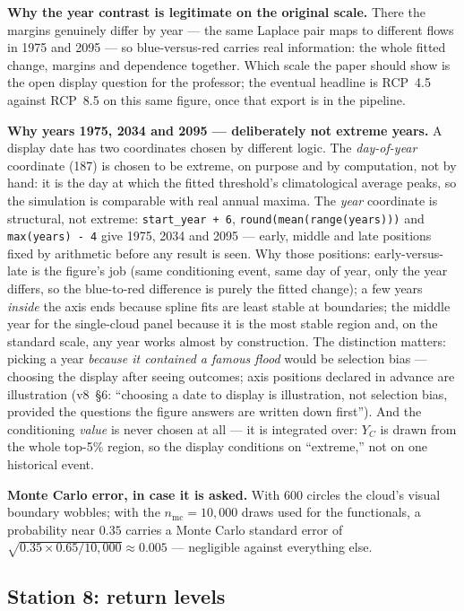 \documentclass[11pt]{article}
\newcommand{\code}[1]{\texttt{#1}}
\begin{document}
\textbf{Why the year contrast is legitimate on the original scale.} There the
margins genuinely differ by year --- the same Laplace pair maps to different
flows in 1975 and 2095 --- so blue-versus-red carries real information: the
whole fitted change, margins and dependence together. Which scale the paper
should show is the open display question for the professor; the eventual
headline is RCP~4.5 against RCP~8.5 on this same figure, once that export is
in the pipeline.

\textbf{Why years 1975, 2034 and 2095 --- deliberately not extreme
years.} A display date has two coordinates chosen by different logic. The
\emph{day-of-year} coordinate (187) is chosen to be extreme, on purpose and
by computation, not by hand: it is the day at which the fitted threshold's
climatological average peaks, so the simulation is comparable with real
annual maxima. The \emph{year} coordinate is structural, not extreme:
\code{start\_year + 6}, \code{round(mean(range(years)))} and
\code{max(years) - 4} give 1975, 2034 and 2095 --- early, middle and late
positions fixed by arithmetic before any result is seen. Why those
positions: early-versus-late is the figure's job (same conditioning event,
same day of year, only the year differs, so the blue-to-red difference is
purely the fitted change); a few years \emph{inside} the axis ends because
spline fits are least stable at boundaries; the middle year for the
single-cloud panel because it is the most stable region and, on the
standard scale, any year works almost by construction. The distinction
matters: picking a year \emph{because it contained a famous flood} would be
selection bias --- choosing the display after seeing outcomes; axis
positions declared in advance are illustration (v8~\S6: ``choosing a date
to display is illustration, not selection bias, provided the questions the
figure answers are written down first''). And the conditioning \emph{value}
is never chosen at all --- it is integrated over: $Y_C$ is drawn from the
whole top-5\% region, so the display conditions on ``extreme,'' not on one
historical event.

\textbf{Monte Carlo error, in case it is asked.} With 600 circles the cloud's
visual boundary wobbles; with the $n_{\mathrm{mc}} = 10{,}000$ draws used for
the functionals, a probability near $0.35$ carries a Monte Carlo standard
error of $\sqrt{0.35 \times 0.65/10{,}000} \approx 0.005$ --- negligible
against everything else.

\subsection{Station 8: return levels}
\label{sec:rl}
\end{document}
